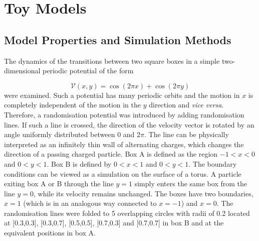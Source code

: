 \section{Toy Models}

\subsection{Model Properties and Simulation Methods}

The dynamics of the transitions between two square boxes in a simple two-dimensional periodic potential of the form

\begin{equation}
\label{eq:toy-pel}
\mathscr{V}(x,y) = \cos (2 \pi x) + \cos (2 \pi y) 
\end{equation}
were examined.
Such a potential has many periodic orbits and the motion in $x$ is completely independent of the motion in the $y$ direction and {\it vice versa}.
Therefore, a randomisation potential was introduced by adding randomisation lines.
If such a line is crossed, the direction of the velocity vector is rotated by an angle uniformly distributed between 0 and $2 \pi$.
The line can be physically interpreted as an infinitely thin wall of alternating charges, which changes the direction of a passing charged particle.
Box A is defined as the region $-1 < x < 0$ and $ 0 < y < 1$.
Box B is defined by $0 < x < 1$ and $ 0 < y < 1$.
The boundary conditions can be viewed as a simulation on the surface of a torus.
A particle exiting box A or B through the line $y = 1$ simply enters the same box from the line $y = 0$, while its velocity remains unchanged.
The boxes have two boundaries, $x = 1$ (which is in an analogous way connected to $x = -1$) and $x = 0$.
The randomisation lines were folded to 5 overlapping circles with radii of 0.2 located at [0.3,0.3], [0.3,0.7], [0.5,0.5], [0.7,0.3] and [0.7,0.7] in box B and at the equivalent positions in box A.

